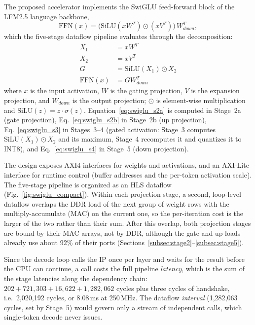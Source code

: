 The proposed accelerator implements the SwiGLU feed-forward block of the LFM2.5 language
backbone,
\begin{equation}
\text{FFN}(x) = \big(\text{SiLU}(x W^{T}) \odot (x V^{T})\big)\, W_{down}^{T},
\label{eq:ffn_hw}
\end{equation}
which the five-stage dataflow pipeline evaluates through the decomposition:
\begin{subequations}\label{eq:swiglu_stage_set}
\begin{align}
X_1 &= x W^{T} \label{eq:swiglu_s2a}\\
X_2 &= x V^{T} \label{eq:swiglu_s2b}\\
G   &= \text{SiLU}(X_1)\odot X_2 \label{eq:swiglu_s3}\\
\text{FFN}(x) &= G W_{down}^{T} \label{eq:swiglu_s4}
\end{align}
\end{subequations}
where $x$ is the input activation, $W$ is the gating projection, $V$ is the expansion
projection, and $W_{down}$ is the output projection; $\odot$ is element-wise
multiplication and $\text{SiLU}(z) = z \cdot \sigma(z)$. Equation~\eqref{eq:swiglu_s2a}
is computed in Stage~2a (gate projection), Eq.~\eqref{eq:swiglu_s2b} in Stage~2b (up
projection), Eq.~\eqref{eq:swiglu_s3} in Stages~3--4 (gated activation: Stage~3
computes $\text{SiLU}(X_1)\odot X_2$ and its maximum, Stage~4 recomputes it and quantizes
it to INT8), and Eq.~\eqref{eq:swiglu_s4} in Stage~5 (down
projection).

The design exposes AXI4 interfaces for weights and activations, and an AXI-Lite
interface for runtime control (buffer addresses and the per-token activation scale). The
five-stage pipeline is organized as an HLS dataflow (Fig.~\ref{fig:swiglu_compact}).
Within each projection stage, a second, loop-level dataflow overlaps the DDR load of the
next group of weight rows with the multiply-accumulate (MAC) on the current one, so the
per-iteration cost is the larger of the two rather than their sum. After this overlap,
both projection stages are bound by their MAC arrays, not by DDR, although the gate and
up loads already use about 92\% of their ports
(Sections~\ref{subsec:stage2}--\ref{subsec:stage5}).

Since the decode loop calls the IP once per layer and waits for the result before the
CPU can continue, a call costs the full pipeline \emph{latency}, which is the sum of the
stage latencies along the dependency chain:
$202 + 721{,}303 + 16{,}622 + 1{,}282{,}062$ cycles plus three cycles of
handshake, i.e.\ 2,020,192 cycles, or 8.08\,ms at 250\,MHz. The dataflow \emph{interval} (1,282,063 cycles, set by Stage~5) would govern
only a stream of independent calls, which single-token decode never issues.

